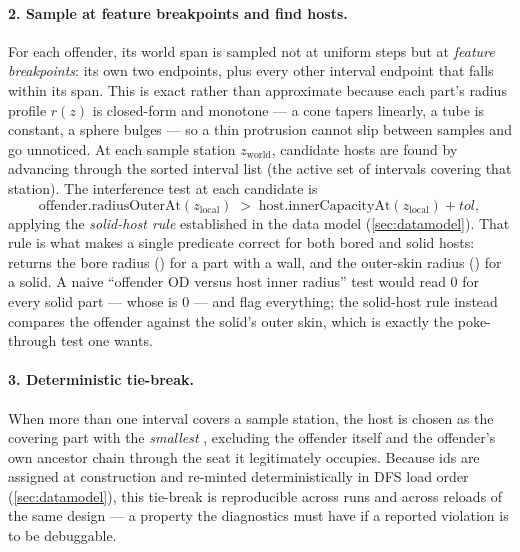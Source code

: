 \paragraph{2. Sample at feature breakpoints and find hosts.} For each offender, its world span
is sampled not at uniform steps but at \emph{feature breakpoints}: its own two endpoints, plus
every other interval endpoint that falls within its span. This is exact rather than approximate
because each part's radius profile $r(z)$ is closed-form and monotone --- a cone tapers
linearly, a tube is constant, a sphere bulges --- so a thin protrusion cannot slip between
samples and go unnoticed. At each sample station $z_{\mathrm{world}}$, candidate hosts are found
by advancing through the sorted interval list (the active set of intervals covering that
station). The interference test at each candidate is
\[
  \text{offender.radiusOuterAt}(z_{\mathrm{local}})
    \;>\;
  \text{host.innerCapacityAt}(z_{\mathrm{local}}) + \mathit{tol},
\]
applying the \emph{solid-host rule} established in the data model (\cref{sec:datamodel}). That
rule is what makes a single predicate correct for both bored and solid hosts:
 returns the bore radius () for a part with a wall,
and the outer-skin radius () for a solid. A naive ``offender OD versus host
inner radius'' test would read $0$ for every solid part --- whose  is $0$
--- and flag everything; the solid-host rule instead compares the offender against the solid's
outer skin, which is exactly the poke-through test one wants.

\paragraph{3. Deterministic tie-break.} When more than one interval covers a sample station, the
host is chosen as the covering part with the \emph{smallest} , excluding the
offender itself and the offender's own ancestor chain through the seat it legitimately occupies.
Because ids are assigned at construction and re-minted deterministically in DFS load order
(\cref{sec:datamodel}), this tie-break is reproducible across runs and across reloads of the
same design --- a property the diagnostics must have if a reported violation is to be
debuggable.

